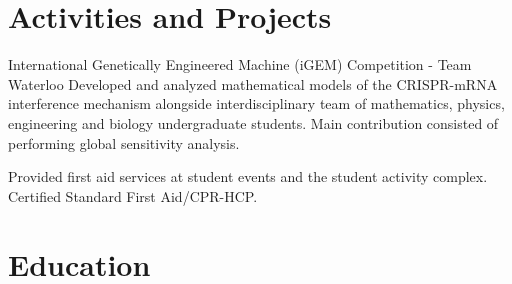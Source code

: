\documentclass[oneside, 10pt]{memoir}
\begin{document}
\section*{Activities and Projects}
\begin{adjustwidth}{1em}{0em}%

    {International Genetically Engineered Machine (iGEM) Competition - Team Waterloo} {
        Developed and analyzed mathematical models of the CRISPR-mRNA interference mechanism alongside
        interdisciplinary team of mathematics, physics, engineering and biology undergraduate students.
        Main contribution consisted of performing global sensitivity analysis.
    }

     {
        Provided first aid services at student events and the student activity complex. 
        Certified Standard First Aid/CPR-HCP.
    }
\end{adjustwidth}

\section*{Education}
\begin{adjustwidth}{1em}{0em}%

\end{adjustwidth}
\end{document}
